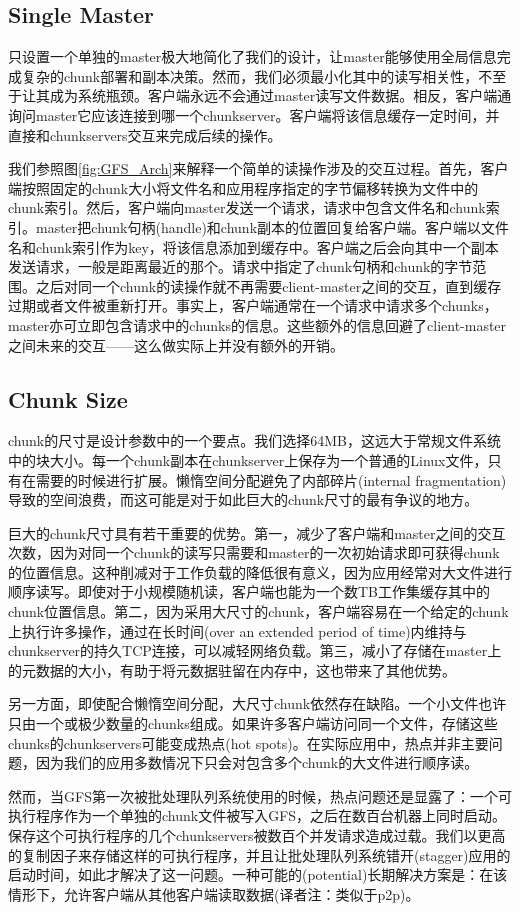 \documentclass{article}
\begin{document}
\subsection{Single Master}
只设置一个单独的master极大地简化了我们的设计，让master能够使用全局信息完成复杂的chunk部署和副本决策。然而，我们必须最小化其中的读写相关性，不至于让其成为系统瓶颈。客户端永远不会通过master读写文件数据。相反，客户端通询问master它应该连接到哪一个chunkserver。客户端将该信息缓存一定时间，并直接和chunkservers交互来完成后续的操作。\par
我们参照图\ref{fig:GFS_Arch}来解释一个简单的读操作涉及的交互过程。首先，客户端按照固定的chunk大小将文件名和应用程序指定的字节偏移转换为文件中的chunk索引。然后，客户端向master发送一个请求，请求中包含文件名和chunk索引。master把chunk句柄(handle)和chunk副本的位置回复给客户端。客户端以文件名和chunk索引作为key，将该信息添加到缓存中。客户端之后会向其中一个副本发送请求，一般是距离最近的那个。请求中指定了chunk句柄和chunk的字节范围。之后对同一个chunk的读操作就不再需要client-master之间的交互，直到缓存过期或者文件被重新打开。事实上，客户端通常在一个请求中请求多个chunks，master亦可立即包含请求中的chunks的信息。这些额外的信息回避了client-master之间未来的交互——这么做实际上并没有额外的开销。

\subsection{Chunk Size}
chunk的尺寸是设计参数中的一个要点。我们选择64MB，这远大于常规文件系统中的块大小。每一个chunk副本在chunkserver上保存为一个普通的Linux文件，只有在需要的时候进行扩展。懒惰空间分配避免了内部碎片(internal fragmentation)导致的空间浪费，而这可能是对于如此巨大的chunk尺寸的最有争议的地方。\par
巨大的chunk尺寸具有若干重要的优势。第一，减少了客户端和master之间的交互次数，因为对同一个chunk的读写只需要和master的一次初始请求即可获得chunk的位置信息。这种削减对于工作负载的降低很有意义，因为应用经常对大文件进行顺序读写。即使对于小规模随机读，客户端也能为一个数TB工作集缓存其中的chunk位置信息。第二，因为采用大尺寸的chunk，客户端容易在一个给定的chunk上执行许多操作，通过在长时间(over an extended period of time)内维持与chunkserver的持久TCP连接，可以减轻网络负载。第三，减小了存储在master上的元数据的大小，有助于将元数据驻留在内存中，这也带来了其他优势。\par
另一方面，即使配合懒惰空间分配，大尺寸chunk依然存在缺陷。一个小文件也许只由一个或极少数量的chunks组成。如果许多客户端访问同一个文件，存储这些chunks的chunkservers可能变成热点(hot spots)。在实际应用中，热点并非主要问题，因为我们的应用多数情况下只会对包含多个chunk的大文件进行顺序读。\par
然而，当GFS第一次被批处理队列系统使用的时候，热点问题还是显露了：一个可执行程序作为一个单独的chunk文件被写入GFS，之后在数百台机器上同时启动。保存这个可执行程序的几个chunkservers被数百个并发请求造成过载。我们以更高的复制因子来存储这样的可执行程序，并且让批处理队列系统错开(stagger)应用的启动时间，如此才解决了这一问题。一种可能的(potential)长期解决方案是：在该情形下，允许客户端从其他客户端读取数据(译者注：类似于p2p)。
\end{document}
